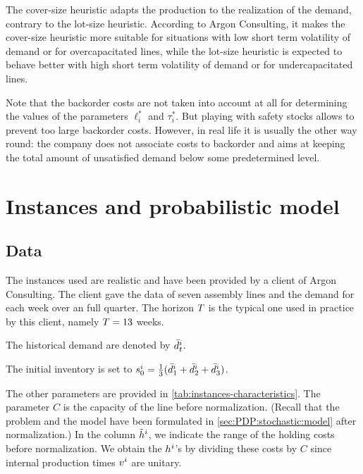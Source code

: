 \medskip

The cover-size heuristic adapts the production to the realization of the demand, contrary to the lot-size heuristic.
According to Argon Consulting, it makes the cover-size heuristic more suitable for situations with low short term volatility of demand or for overcapacitated lines, while the lot-size heuristic is expected to behave better with high short term volatility of demand or for undercapacitated lines.


Note that the backorder costs are not taken into account at all for determining the values of the parameters $\ell_i^*$ and $\tau_i^*$.
But playing with safety stocks allows to prevent too large backorder costs.
However, in real life it is usually the other way round: the company does not associate costs to backorder and aims at keeping the total amount of unsatisfied demand below some predetermined level.




\section{Instances and probabilistic model}

\subsection{Data}
\label{sec:PDP:numerical-experiments:historical-data}

The instances used are realistic and have been provided by a client of Argon Consulting.
The client gave the data of seven assembly lines and the demand for each week over an full quarter.
The horizon $T$ is the typical one used in practice by this client, namely $T=13$ weeks.

The historical demand are denoted by $\bar{d}_t^i$.

The initial inventory is set to $s_0^i=\frac{1}{3}(\bar{d}_1^i+\bar{d}_2^i+\bar{d}_3^i)$.

The other parameters are provided in \cref{tab:instances-characteristics}.
The parameter $C$ is the capacity of the line before normalization.
(Recall that the problem and the model have been formulated in \cref{sec:PDP:stochastic:model} after normalization.)
In the column $\tilde{h}^i$, we indicate the range of the holding costs before normalization.
We obtain the $h^i$'s by dividing these costs by $C$ since internal production times $v^i$ are unitary.

